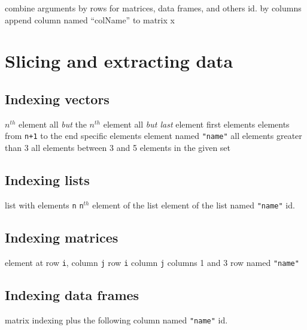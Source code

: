 	{combine arguments by rows for matrices, data frames, and
others}
	{id. by columns}
	{append column named ``colName'' to matrix x}

\section{Slicing and extracting data}{}
\subsection{Indexing vectors}{}
	{ $ n^{th} $ element}
	{all {\it but} the $ n^{th} $ element}
	{all {\it but last} element}
	{first elements}
	{elements from {\tt n+1} to the end}
	{specific elements}
	{element named {\tt "name"}}
	{all elements greater than 3}
	{all elements between 3 and 5}
	{elements in the given set}

\subsection{Indexing lists}{}

	{list with elements {\tt n}}
	{{\tt n}$^{th}$ element of the list}
	{element of the list named {\tt "name"}}
	{id.}


\subsection{Indexing matrices}{}
	{element at row {\tt i}, column {\tt j}}
	{row {\tt i}}
	{column {\tt j}}
	{columns 1 and 3}
	{row named {\tt "name"}}

\subsection{Indexing data frames}{matrix indexing plus the following}
	{column named {\tt "name"}}
	{id.}

